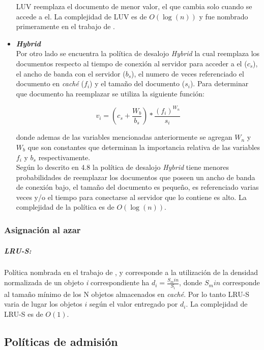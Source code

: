 \documentclass[12pt]{ociamthesis}  %
\begin{document}
\begin{itemize}
	LUV reemplaza el documento de menor valor, el que cambia solo cuando se accede a el. La complejidad de LUV es de $O(\log(n))$ y fue nombrado primeramente en el trabajo de \cite{bahn2002efficient}.
	
	\item \textbf{\textit{Hybrid}}\\
	Por otro lado se encuentra la política de desalojo \textit{Hybrid} la cual reemplaza los documentos respecto al tiempo de conexión al servidor para acceder a el ($c_s$), el ancho de banda con el servidor ($b_s$), el numero de veces referenciado el documento en \textit{caché} ($f_i$) y el tamaño del documento ($s_i$). Para determinar que documento ha reemplazar se utiliza la siguiente función:

	\begin{equation}
	v_i = \left(c_s + \frac{W_b}{b_s}\right) * \frac{(f_i)^{W_n}}{s_i}
	\end{equation}
	
	donde ademas de las variables mencionadas anteriormente se agregan $W_n$ y $W_b$ que son constantes que determinan la importancia relativa de las variables $f_i$ y $b_s$ respectivamente.\\
	
	Según lo descrito en 4.8 la política de desalojo \textit{Hybrid} tiene menores probabilidades de reemplazar los documentos que poseen un ancho de banda de conexión bajo, el tamaño del documento es pequeño, es referenciado varias veces y/o el tiempo para conectarse al servidor que lo contiene es alto. La complejidad de la política es de $O(\log(n))$.

\end{itemize}

\subsubsection{Asignación al azar}

\subparagraph{LRU-S:}
Política nombrada en el trabajo de , y corresponde a la utilización de la densidad normalizada de un objeto \textit{i} correspondiente ha $d_i = \frac{S_min}{S_i}$, donde $S_min$ corresponde al tamaño mínimo de los N objetos almacenados en \textit{caché}. Por lo tanto LRU-S varia de lugar los objetos $i$ según el valor entregado por $d_i$. La complejidad de LRU-S es de $O(1)$.



\subsection{Políticas de admisión}
\end{document}

